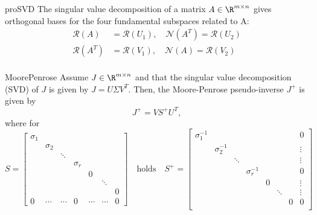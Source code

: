 \begin{pro}{proSVD}
    The singular value decomposition of a matrix $A \in \R^{m \times n}$ gives orthogonal bases for the four fundamental subspaces related to A:
    \begin{align*}
        \mathcal{R}(A) &= \mathcal{R}(U_1), \quad \mathcal{N}(A^T) = \mathcal{R}(U_2) \\
        \mathcal{R}(A^T) &= \mathcal{R}(V_1), \quad \mathcal{N}(A) = \mathcal{R}(V_2) \\
    \end{align*}
    \vspace{-1cm}
\end{pro}

\newpage

\begin{theo}{MoorePenrose}
    Assume $J \in \R^{m \times n}$ and that the singular value decomposition (SVD) of $J$ is given by $J = U \Sigma V^T$. Then, the Moore-Penrose pseudo-inverse $J^+$ is given by
    \begin{equation*}
        J^+ = V S^+ U^T,
    \end{equation*}
    where for
    \begin{equation*}
    S = 
        \left[
        \begin{array}{ccccccc}
        \sigma_1 &  &  &  &  &  \\
         & \sigma_2 &  &  &  &  \\
         &  & \ddots &  &  & \\
         &  &  & \sigma_r &  & \\
         &  &  &  & 0 & & \\
         &  &  &  & & \ddots & \\
         &  &  &  & & & 0 \\
        \hline
        0 & \cdots & \cdots & 0 & \cdots & \cdots & 0
        \end{array}
        \right]
    \quad \text{holds} \quad
    S^+ = 
        \left[
        \begin{array}{ccccccc|c}
            \sigma_1^{-1} &  &  &  &  & & & 0\\
            & \sigma_2^{-1} &  &  &  & &  & \vdots \\
            &  & \ddots &  &  & & & \vdots \\
            &  &  & \sigma_r^{-1} & & & & 0\\
            &  &  &  & 0 & & & \vdots\\
            &  &  &  & & \ddots &  & \vdots\\
            &  &  &  & & & 0 & 0\\
        \end{array}
        \right]
    \end{equation*}
\end{theo}

